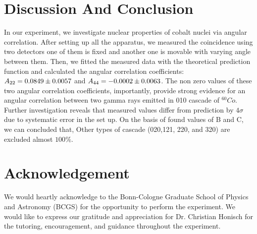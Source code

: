 \newpage
\section{Discussion And Conclusion}
In our experiment, we investigate nuclear properties of cobalt nuclei via angular correlation. After setting up all the apparatus, we measured the coincidence using two detectors one of them is fixed and another one is movable with varying angle between them. Then, we fitted the measured data with the theoretical prediction function and calculated the angular correlation coefficients:  $ A_{22}= \num{0.0849 +- 0.0057} $ and $A_{44}=\num{-0.0002 +- 0.0063} $. The non zero values of these two angular correlation coefficients, importantly, provide strong evidence for an angular correlation between two gamma rays emitted in 010 cascade of $ ^{60}Co $. Further investigation reveals that measured values differ from prediction by $4\sigma$ due to systematic error in the set up. On the basis of found values of B and C, we can concluded that, Other types of cascade (020,121, 220, and 320) are excluded almost $100\%$. 


\newpage
\section{Acknowledgement}
We would heartly acknowledge to the Bonn-Cologne Graduate School of Physics and Astronomy (BCGS) for the opportunity to perform the experiment. We would like to express our gratitude and appreciation for Dr. Christian Honisch for the tutoring, encouragement, and guidance throughout the experiment.